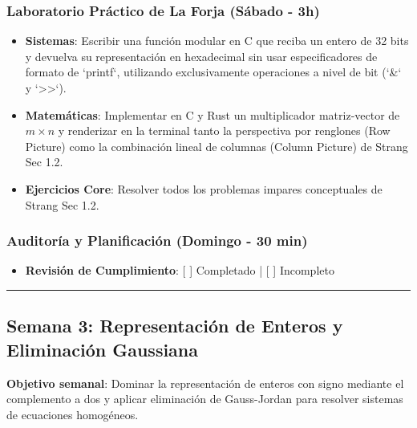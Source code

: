 \documentclass[11pt, a4paper]{article}
\begin{document}
\subsubsection{Laboratorio Práctico de La Forja (Sábado - 3h)}
\begin{itemize}
    \item \textbf{Sistemas}: Escribir una función modular en C que reciba un entero de 32 bits y devuelva su representación en hexadecimal sin usar especificadores de formato de `printf`, utilizando exclusivamente operaciones a nivel de bit (`\&` y `>>`).
    \item \textbf{Matemáticas}: Implementar en C y Rust un multiplicador matriz-vector de $m \times n$ y renderizar en la terminal tanto la perspectiva por renglones (Row Picture) como la combinación lineal de columnas (Column Picture) de Strang Sec 1.2.
    \item \textbf{Ejercicios Core}: Resolver todos los problemas impares conceptuales de Strang Sec 1.2.
\end{itemize}

\subsubsection{Auditoría y Planificación (Domingo - 30 min)}
\begin{itemize}
    \item \textbf{Revisión de Cumplimiento}: [ ] Completado | [ ] Incompleto
\end{itemize}

\noindent\rule{\textwidth}{0.4pt}

\subsection{Semana 3: Representación de Enteros y Eliminación Gaussiana}
\textbf{Objetivo semanal}: Dominar la representación de enteros con signo mediante el complemento a dos y aplicar eliminación de Gauss-Jordan para resolver sistemas de ecuaciones homogéneos.
\end{document}
